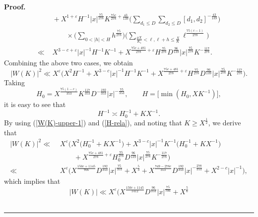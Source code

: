 \documentclass[a4paper,oneside,11pt]{article}%
\newenvironment{proof}[1][Proof]{\noindent \textbf{#1.} }{\  \rule{0.5em}{0.5em}}
\numberwithin{equation}{section}
\begin{document}
\begin{proof}
\begin{align*}
& \,\, +X^{1+\varepsilon}H^{-1}|x|^{\frac{75}{278}}K^{\frac{75c}{278}+\frac{43}{139}}
        \Bigg(\sum_{d_1\leqslant D}\sum_{d_2\leqslant D}[d_1,d_2]^{-\frac{43}{139}}\Bigg)
                    \nonumber \\
 & \,\,   \qquad \times \Bigg(\sum_{0<|h|<H}h^{\frac{75}{278}}\Bigg)
          \Bigg(\sum_{\frac{\mu X}{K_1}<\ell,\ell+h\leqslant\frac{X}{K}}\ell^{\frac{75(c-1)}{278}}\Bigg)
                    \nonumber \\
\ll & \,\, X^{3-c+\varepsilon}|x|^{-1}H^{-1}K^{-1}+X^{\frac{75c+481}{278}+\varepsilon}H^{\frac{75}{278}}D^{\frac{96}{139}}
           |x|^{\frac{75}{278}}K^{-\frac{117}{278}}.
\end{align*}
Combining the above two cases, we obtain
\begin{equation}\label{W(K)-upper-1}
  \big|W(K)\big|^2\ll X^\varepsilon\Big(X^2H^{-1}+X^{3-c}|x|^{-1}H^{-1}K^{-1}+X^{\frac{75c+481}{278}+\varepsilon}
                      H^{\frac{75}{278}}D^{\frac{96}{139}}|x|^{\frac{75}{278}}K^{-\frac{117}{278}}\Big).
\end{equation}
Taking
\begin{equation*}
  H_0=X^{\frac{75(1-c)}{353}}K^{\frac{117}{353}}D^{-\frac{192}{353}}|x|^{-\frac{75}{353}},\qquad
  H=\big[\min(H_0,XK^{-1})\big],
\end{equation*}
it is easy to see that
\begin{equation}\label{H-rela}
  H^{-1}\asymp H_0^{-1}+KX^{-1}.
\end{equation}
By using (\ref{W(K)-upper-1}) and (\ref{H-rela}), and noting that $K\geqslant X^{\frac{1}{2}}$, we derive that
\begin{align*}
           \big|W(K)\big|^2
\ll & \,\, X^\varepsilon\Big(X^2\big(H_0^{-1}+KX^{-1}\big)+X^{3-c}|x|^{-1}K^{-1}\big(H_0^{-1}+KX^{-1}\big)
                 \nonumber \\
 & \,\,\qquad +X^{\frac{75c+481}{278}+\varepsilon}H_0^{\frac{75}{278}}D^{\frac{96}{139}}
              |x|^{\frac{75}{278}}K^{-\frac{117}{278}}\Big)
                 \nonumber \\
\ll & \,\, X^\varepsilon \Big(X^{\frac{150c+1145}{706}}D^{\frac{192}{353}}|x|^{\frac{75}{353}}+X^{\frac{5}{3}}
           +X^{\frac{749-278c}{353}}D^{\frac{192}{353}}|x|^{-\frac{278}{353}}+X^{2-c}|x|^{-1}\Big),
\end{align*}
which implies that
\begin{equation}\label{W(K)-upp-fi}
 \big|W(K)\big|\ll X^\varepsilon\Big(X^{\frac{150c+1145}{1412}}D^{\frac{96}{353}}|x|^{\frac{75}{706}}+X^{\frac{5}{6}}

\end{equation}
\end{proof}
\end{document}
